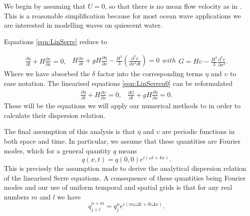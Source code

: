 We begin by assuming that $U = 0$, so that there is no mean flow velocity as in \cite{Filippini-etal-2016-381}. This is a reasonable simplification because for most ocean wave applications we are interested in modelling waves on quiescent water.

Equations \eqref{eqn:LinSerre} reduce to

\begin{subequations}
	\label{eqn:LinSerreu0}
	\begin{gather}
	\label{eqn:LinContu0}
	\frac{\partial  \eta}{\partial  t} + H\frac{\partial  \upsilon}{\partial  x} = 0,
	\end{gather}
	\begin{gather}
	\label{eqn:LineMomeu0}
	H\frac{\partial  \upsilon}{\partial  t} + g H \frac{\partial  \eta}{\partial  x} - \frac{H^3}{3}\left(\frac{\partial^3  \upsilon}{\partial  x^3 \partial  t}  \right)  = 0
	\end{gather}	
with
	\begin{gather}
	G = H\upsilon -\frac{H^3}{3} \frac{\partial^2 \upsilon}{\partial x^2}.
	\label{eqn:LinConSerreGu0}
	\end{gather}	
\end{subequations}
Where we have absorbed the $\delta$ factor into the corresponding terms $\eta$ and $\upsilon$ to ease notation. The linearised equations \eqref{eqn:LinSerreu0} can be reformulated 
\begin{subequations}
	\begin{gather}
	\label{eqn:LinContG}
	\frac{\partial  \eta}{\partial  t} + H\frac{\partial  \upsilon}{\partial  x} = 0,
	\end{gather}
	\begin{gather}
	\label{eqn:LineMomeG}
	\frac{\partial  G}{\partial  t} + g H \frac{\partial  \eta}{\partial  x}  = 0.
	\end{gather}
	\label{eqn:LinSerreG}	
\end{subequations}
These will be the equations we will apply our numerical methods to in order to calculate their dispersion relation.

The final assumption of this analysis is that $\eta$ and $\upsilon$ are periodic functions in both space and time. In particular, we assume that these quantities are Fourier modes, which for a general quantity $q$ means
\begin{equation}
q(x,t) = q(0,0) e^{i\left(\omega t + kx\right)}.
\label{eqn:FourierNode}
\end{equation}
This is precisely the assumption made to derive the analytical dispersion relation of the linearised Serre equations. A consequence of these quantities being Fourier modes and our use of uniform temporal and spatial grids is that for any real numbers $m$ and $l$ we have
\begin{equation}
q^{n + m}_{j + l} = q^n_j e^{ i \left(m \omega \Delta t + l k \Delta x\right)}.
\label{eqn:fourierfactor}
\end{equation}




